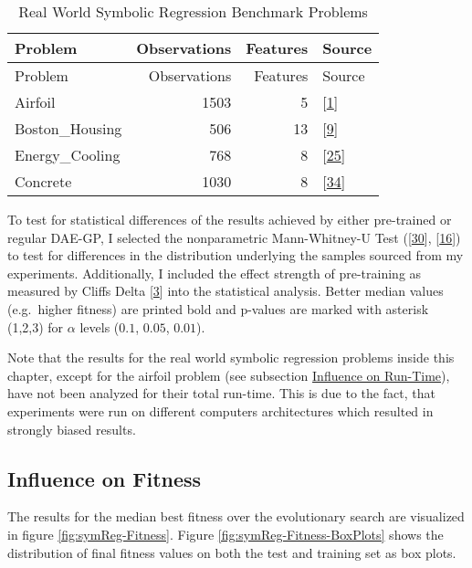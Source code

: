 \documentclass[
  11pt,
]{article}
\begin{document}
\begin{longtable}[]{@{}lrrl@{}}
\caption{\label{tab:full-run-realWorldSymReg-problems}Real World Symbolic Regression Benchmark Problems}\tabularnewline
\toprule\noalign{}
Problem & Observations & Features & Source \\
\midrule\noalign{}
\endfirsthead
\toprule\noalign{}
Problem & Observations & Features & Source \\
\midrule\noalign{}
\endhead
\bottomrule\noalign{}
\endlastfoot
Airfoil & 1503 & 5 & {[}\protect\hyperlink{ref-AIRFOIL_DATASET}{1}{]} \\
Boston\_Housing & 506 & 13 & {[}\protect\hyperlink{ref-BOSTON_HOUSING_DATASET}{9}{]} \\
Energy\_Cooling & 768 & 8 & {[}\protect\hyperlink{ref-ENERGY_DATASET}{25}{]} \\
Concrete & 1030 & 8 & {[}\protect\hyperlink{ref-CONCRETE_DATASET}{34}{]} \\
\end{longtable}

To test for statistical differences of the results achieved by either pre-trained or regular DAE-GP, I selected the nonparametric Mann-Whitney-U Test ({[}\protect\hyperlink{ref-mwu1}{30}{]}, {[}\protect\hyperlink{ref-mwu2}{16}{]}) to test for differences in the distribution underlying the samples sourced from my experiments. Additionally, I included the effect strength of pre-training as measured by Cliffs Delta {[}\protect\hyperlink{ref-Cliff1993DominanceSO}{3}{]} into the statistical analysis. Better median values (e.g.~higher fitness) are printed bold and p-values are marked with asterisk (1,2,3) for \(\alpha\) levels (\(0.1\), \(0.05\), \(0.01\)).

Note that the results for the real world symbolic regression problems inside this chapter, except for the airfoil problem (see subsection \protect\hyperlink{influence-on-run-time}{Influence on Run-Time}), have not been analyzed for their total run-time. This is due to the fact, that experiments were run on different computers architectures which resulted in strongly biased results.

\hypertarget{influence-on-fitness}{%
\subsection{Influence on Fitness}\label{influence-on-fitness}}

The results for the median best fitness over the evolutionary search are visualized in figure \ref{fig:symReg-Fitness}. Figure \ref{fig:symReg-Fitness-BoxPlots} shows the distribution of final fitness values on both the test and training set as box plots.
\end{document}

